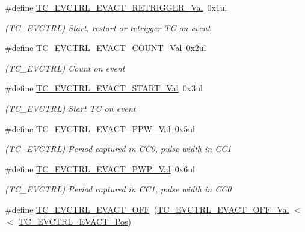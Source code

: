 \begin{DoxyCompactItemize}
\#define \mbox{\hyperlink{group___s_a_m_d21___t_c_gad84c852c18be67ba892810f8615c4937}{T\+C\+\_\+\+E\+V\+C\+T\+R\+L\+\_\+\+E\+V\+A\+C\+T\+\_\+\+R\+E\+T\+R\+I\+G\+G\+E\+R\+\_\+\+Val}}~0x1ul
\begin{DoxyCompactList}\small\item\em (T\+C\+\_\+\+E\+V\+C\+T\+RL) Start, restart or retrigger TC on event \end{DoxyCompactList}\item 
\#define \mbox{\hyperlink{group___s_a_m_d21___t_c_gaf491ae01652acf31a121fc976e34ec0c}{T\+C\+\_\+\+E\+V\+C\+T\+R\+L\+\_\+\+E\+V\+A\+C\+T\+\_\+\+C\+O\+U\+N\+T\+\_\+\+Val}}~0x2ul
\begin{DoxyCompactList}\small\item\em (T\+C\+\_\+\+E\+V\+C\+T\+RL) Count on event \end{DoxyCompactList}\item 
\#define \mbox{\hyperlink{group___s_a_m_d21___t_c_ga2851bff08dbc48025416547d4274e508}{T\+C\+\_\+\+E\+V\+C\+T\+R\+L\+\_\+\+E\+V\+A\+C\+T\+\_\+\+S\+T\+A\+R\+T\+\_\+\+Val}}~0x3ul
\begin{DoxyCompactList}\small\item\em (T\+C\+\_\+\+E\+V\+C\+T\+RL) Start TC on event \end{DoxyCompactList}\item 
\#define \mbox{\hyperlink{group___s_a_m_d21___t_c_gacc79333089f684803e5f0e892b0c7f03}{T\+C\+\_\+\+E\+V\+C\+T\+R\+L\+\_\+\+E\+V\+A\+C\+T\+\_\+\+P\+P\+W\+\_\+\+Val}}~0x5ul
\begin{DoxyCompactList}\small\item\em (T\+C\+\_\+\+E\+V\+C\+T\+RL) Period captured in C\+C0, pulse width in C\+C1 \end{DoxyCompactList}\item 
\#define \mbox{\hyperlink{group___s_a_m_d21___t_c_gab0aa01d513903be5490afa1e56e27486}{T\+C\+\_\+\+E\+V\+C\+T\+R\+L\+\_\+\+E\+V\+A\+C\+T\+\_\+\+P\+W\+P\+\_\+\+Val}}~0x6ul
\begin{DoxyCompactList}\small\item\em (T\+C\+\_\+\+E\+V\+C\+T\+RL) Period captured in C\+C1, pulse width in C\+C0 \end{DoxyCompactList}\item 
\#define \mbox{\hyperlink{group___s_a_m_d21___t_c_ga60e80a04528abe7447554bfa6e5cb40c}{T\+C\+\_\+\+E\+V\+C\+T\+R\+L\+\_\+\+E\+V\+A\+C\+T\+\_\+\+O\+FF}}~(\mbox{\hyperlink{group___s_a_m_d21___t_c_ga34fd9cc9a5f397f3200ce035f6e7dc2b}{T\+C\+\_\+\+E\+V\+C\+T\+R\+L\+\_\+\+E\+V\+A\+C\+T\+\_\+\+O\+F\+F\+\_\+\+Val}}       $<$$<$ \mbox{\hyperlink{group___s_a_m_d21___t_c_ga29f3c9802b04bc3c9e151e388abf2f08}{T\+C\+\_\+\+E\+V\+C\+T\+R\+L\+\_\+\+E\+V\+A\+C\+T\+\_\+\+Pos}})
$$
\end{DoxyCompactItemize}
